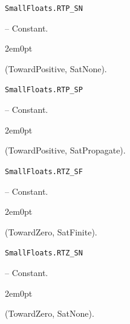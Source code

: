 \par\medskip\noindent\begin{minipage}{\linewidth}
\hypertarget{1691628013094057374}{\texttt{SmallFloats.RTP\_\allowbreak{}SN}}  -- {Constant.}
\nopagebreak
\begin{adjustwidth}{2em}{0pt}

(TowardPositive, SatNone).



\end{adjustwidth}
\end{minipage}
\par\medskip

\par\medskip\noindent\begin{minipage}{\linewidth}
\hypertarget{1355188992532382511}{\texttt{SmallFloats.RTP\_\allowbreak{}SP}}  -- {Constant.}
\nopagebreak
\begin{adjustwidth}{2em}{0pt}

(TowardPositive, SatPropagate).



\end{adjustwidth}
\end{minipage}
\par\medskip

\par\medskip\noindent\begin{minipage}{\linewidth}
\hypertarget{16398804727682363821}{\texttt{SmallFloats.RTZ\_\allowbreak{}SF}}  -- {Constant.}
\nopagebreak
\begin{adjustwidth}{2em}{0pt}

(TowardZero, SatFinite).



\end{adjustwidth}
\end{minipage}
\par\medskip

\par\medskip\noindent\begin{minipage}{\linewidth}
\hypertarget{18041415609987892616}{\texttt{SmallFloats.RTZ\_\allowbreak{}SN}}  -- {Constant.}
\nopagebreak
\begin{adjustwidth}{2em}{0pt}

(TowardZero, SatNone).



\end{adjustwidth}
\end{minipage}
\par\medskip

